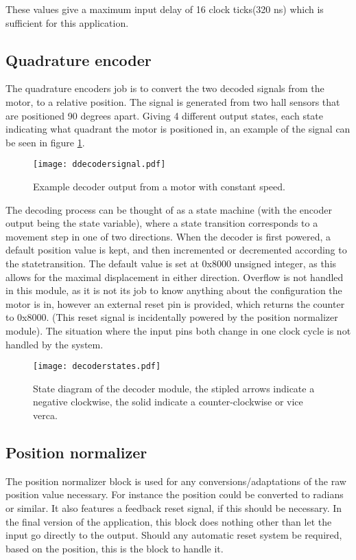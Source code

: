 These values give a maximum input delay of 16 clock ticks(320 ns) which is sufficient for this application.

\subsection{Quadrature encoder}
The quadrature encoders job is to convert the two decoded signals from the motor, to a relative position. The signal is generated from two hall sensors that are positioned 90 degrees apart. Giving 4 different output states, each state indicating what quadrant the motor is positioned in, an example of the signal can be seen in figure \ref{fig:decodersignal}.
\begin{figure}[htb]
\centering
\texttt{[image: ddecodersignal.pdf]}
\caption{Example decoder output from a motor with constant speed.}
\label{fig:decodersignal}
\end{figure}
The decoding process can be thought of as a state machine (with the encoder output being the state variable), where a state transition corresponds to a movement step in one of two directions.
When the decoder is first powered, a default position value is kept, and then incremented or decremented according to the statetransition. The default value is set at 0x8000 unsigned integer, as this allows for the maximal displacement in either direction. 
Overflow is not handled in this module, as it is not its job to know anything about the configuration the motor is in, however an external reset pin is provided, which returns the counter to 0x8000. (This reset signal is incidentally powered by the position normalizer module).
The situation where the input pins both change in one clock cycle is not handled by the system.

\begin{figure}[htb]
\centering
\texttt{[image: decoderstates.pdf]}
\caption{State diagram of the decoder module, the stipled arrows indicate a negative clockwise, the solid indicate a counter-clockwise or vice verca.}
\label{fig:decoderstate}
\end{figure}

\subsection{Position normalizer}
The position normalizer block is used for any conversions/adaptations of the raw position value necessary. For instance the position could be converted to radians or similar. It also features a feedback reset signal, if this should be necessary. 
In the final version of the application, this block does nothing other than let the input go directly to the output.
Should any automatic reset system be required, based on the position, this is the block to handle it.

